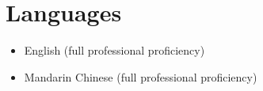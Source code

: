 \documentclass{article}
\begin{document}
\section*{Languages}

\begin{itemize}
    \item English (full professional proficiency)
    \item Mandarin Chinese (full professional proficiency)
\end{itemize}
\end{document}
